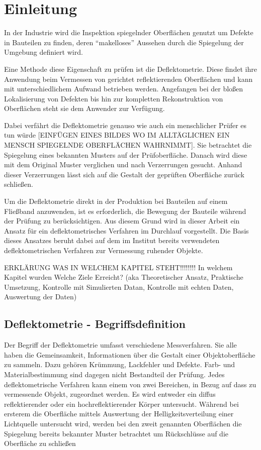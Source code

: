 
\chapter{Einleitung}{\label{Kap1}}

In der Industrie wird die Inspektion spiegelnder Oberflächen genutzt um Defekte in Bauteilen zu finden, deren "`makelloses"' Aussehen durch die Spiegelung der Umgebung definiert wird.

Eine Methode diese Eigenschaft zu prüfen ist die Deflektometrie. Diese findet ihre Anwendung beim Vermessen von gerichtet reflektierenden Oberflächen und kann mit unterschiedlichem Aufwand betrieben werden. Angefangen bei der bloßen Lokalisierung von Defekten bis hin zur kompletten Rekonstruktion von Oberflächen steht sie dem Anwender zur Verfügung.

Dabei verfährt die Deflektometrie genauso wie auch ein menschlicher Prüfer es tun würde [EINFÜGEN EINES BILDES WO IM ALLTÄGLICHEN EIN MENSCH SPIEGELNDE OBERFLÄCHEN WAHRNIMMT]. Sie betrachtet die Spiegelung eines bekannten Musters auf der Prüfoberfläche. Danach wird diese mit dem Original Muster verglichen und nach Verzerrungen gesucht. Anhand dieser Verzerrungen lässt sich auf die Gestalt der geprüften Oberfläche zurück schließen.

Um die Deflektometrie direkt in der Produktion bei Bauteilen auf einem Fließband anzuwenden, ist es erforderlich, die Bewegung der Bauteile während der Prüfung zu berücksichtigen. Aus diesem Grund wird in dieser Arbeit ein Ansatz für ein deflektometrisches Verfahren im Durchlauf vorgestellt. Die Basis dieses Ansatzes beruht dabei auf dem im Institut bereits verwendeten deflektometrischen Verfahren zur Vermessung ruhender Objekte.

ERKLÄRUNG WAS IN WELCHEM KAPITEL STEHT!!!!!!!! In welchem Kapitel wurden Welche Ziele Erreicht? (aka Theoretischer Ansatz, Praktische Umsetzung, Kontrolle mit Simulierten Datan, Kontrolle mit echten Daten, Auswertung der Daten)

\section{Deflektometrie - Begriffsdefinition}

Der Begriff der Deflektometrie umfasst verschiedene Messverfahren. Sie alle haben die Gemeinsamkeit, Informationen über die Gestalt einer Objektoberfläche zu sammeln. Dazu gehören Krümmung, Lackfehler und Defekte. Farb- und Materialbestimmung sind dagegen nicht Bestandteil der Prüfung. Jedes deflektometrische Verfahren kann einem von zwei Bereichen, in Bezug auf dass zu vermessende Objekt, zugeordnet werden. Es wird entweder ein diffus reflektierender oder ein hochreflektierender Körper untersucht. Während bei ersterem die Oberfläche mittels Auswertung der Helligkeitsverteilung einer Lichtquelle untersucht wird, werden bei den zweit genannten Oberflächen die Spiegelung bereits bekannter Muster betrachtet um Rückschlüsse auf die Oberfläche zu schließen

